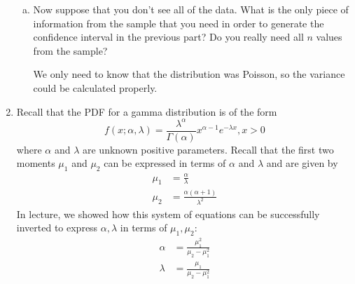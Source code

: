 \documentclass{article}
\begin{document}
\begin{enumerate}
\begin{enumerate}[(a)]
			\item Now suppose that you don't see all of the data. What is the only piece of information from the sample that you need in order to generate the confidence interval in the previous part? Do you really need all $n$ values from the sample?
				
				\begin{answer*}
					We only need to know that the distribution was Poisson, so the variance could be calculated properly.

				\end{answer*}
		\end{enumerate}

	\item Recall that the PDF for a gamma distribution is of the form \[f(x; \alpha, \lambda)=\frac{\lambda^{\alpha}}{\Gamma(\alpha)}x^{\alpha-1}e^{-\lambda x}, x>0\] where $\alpha$ and $\lambda$ are unknown positive parameters. Recall that the first two moments $\mu_1$ and $\mu_2$ can be expressed in terms of $\alpha$ and $\lambda$ and are given by 
		\begin{align*}
			\mu_1 &= \frac{\alpha}{\lambda} \\
			\mu_2 &= \frac{\alpha(\alpha+1)}{\lambda^2}
		\end{align*}
		In lecture, we showed how this system of equations can be successfully inverted to express $\alpha, \lambda$ in terms of $\mu_1, \mu_2:$ 
		\begin{align*}
			\alpha &= \frac{\mu_1^2}{\mu_2-\mu_1^2} \\
			\lambda &= \frac{\mu_1}{\mu_2-\mu_1^2}
		\end{align*}
		

\end{enumerate}
\end{document}
